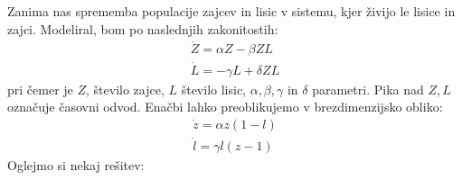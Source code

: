 \documentclass[slovene,11pt,a4paper]{article}
\numberwithin{equation}{section} %
\numberwithin{figure}{section} %
\numberwithin{table}{section} %
\begin{document}
Zanima nas sprememba populacije zajcev in lisic v sistemu, kjer živijo le lisice in zajci. Modeliral, bom po naslednjih zakonitostih:
\begin{equation}
\begin{aligned}
\dot{Z}=\alpha Z-\beta Z L \\
\dot{L} = - \gamma L+\delta Z L
\end{aligned}
\end{equation}
pri čemer je $Z$, število zajce, $L$ število lisic, $\alpha, \beta, \gamma \text{ in } \delta$ parametri. Pika nad $Z,L$ označuje časovni odvod. Enačbi lahko preoblikujemo v brezdimenzijsko obliko:
\begin{equation}
\label{brezdim-osnovna-zajci}
\begin{aligned}
\dot{z}=\alpha z(1-l) \\
\dot{l} = \gamma l(z-1)
\end{aligned}
\end{equation}
Oglejmo si nekaj rešitev:
\end{document}
